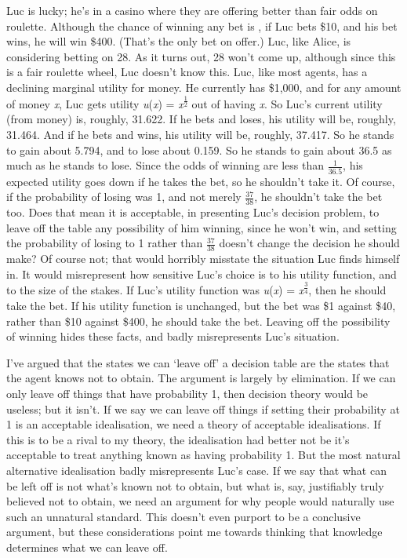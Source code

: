 \documentclass[
  10pt,
  letterpaper,
  DIV=11,
  numbers=noendperiod,
  twoside]{scrartcl}
\begin{document}
Luc is lucky; he's in a casino where they are offering better than fair
odds on roulette. Although the chance of winning any bet is , if Luc
bets \$10, and his bet wins, he will win \$400. (That's the only bet on
offer.) Luc, like Alice, is considering betting on 28. As it turns out,
28 won't come up, although since this is a fair roulette wheel, Luc
doesn't know this. Luc, like most agents, has a declining marginal
utility for money. He currently has \$1,000, and for any amount of money
\emph{x}, Luc gets utility \emph{u}(\emph{x}) =
\emph{x}\textsuperscript{\(\frac{1}{2}\)} out of having \emph{x}. So
Luc's current utility (from money) is, roughly, 31.622. If he bets and
loses, his utility will be, roughly, 31.464. And if he bets and wins,
his utility will be, roughly, 37.417. So he stands to gain about 5.794,
and to lose about 0.159. So he stands to gain about 36.5 as much as he
stands to lose. Since the odds of winning are less than
\(\frac{1}{36.5}\), his expected utility goes down if he takes the bet,
so he shouldn't take it. Of course, if the probability of losing was 1,
and not merely \(\frac{37}{38}\), he shouldn't take the bet too. Does
that mean it is acceptable, in presenting Luc's decision problem, to
leave off the table any possibility of him winning, since he won't win,
and setting the probability of losing to 1 rather than \(\frac{37}{38}\)
doesn't change the decision he should make? Of course not; that would
horribly misstate the situation Luc finds himself in. It would
misrepresent how sensitive Luc's choice is to his utility function, and
to the size of the stakes. If Luc's utility function was
\emph{u}(\emph{x}) = \emph{x}\textsuperscript{\(\frac{3}{4}\)}, then he
should take the bet. If his utility function is unchanged, but the bet
was \$1 against \$40, rather than \$10 against \$400, he should take the
bet. Leaving off the possibility of winning hides these facts, and badly
misrepresents Luc's situation.

I've argued that the states we can `leave off' a decision table are the
states that the agent knows not to obtain. The argument is largely by
elimination. If we can only leave off things that have probability 1,
then decision theory would be useless; but it isn't. If we say we can
leave off things if setting their probability at 1 is an acceptable
idealisation, we need a theory of acceptable idealisations. If this is
to be a rival to my theory, the idealisation had better not be it's
acceptable to treat anything known as having probability 1. But the most
natural alternative idealisation badly misrepresents Luc's case. If we
say that what can be left off is not what's known not to obtain, but
what is, say, justifiably truly believed not to obtain, we need an
argument for why people would naturally use such an unnatural standard.
This doesn't even purport to be a conclusive argument, but these
considerations point me towards thinking that knowledge determines what
we can leave off.
\end{document}
